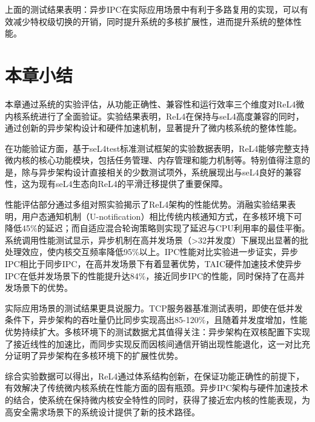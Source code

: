 上面的测试结果表明：异步IPC在实际应用场景中有利于多路复用的实现，可以有效减少特权级切换的开销，同时提升系统的多核扩展性，进而提升系统的整体性能。

\section{本章小结}
本章通过系统的实验评估，从功能正确性、兼容性和运行效率三个维度对ReL4微内核系统进行了全面验证。实验结果表明，ReL4在保持与seL4高度兼容的同时，通过创新的异步架构设计和硬件加速机制，显著提升了微内核系统的整体性能。

在功能验证方面，基于seL4test标准测试框架的实验数据表明，ReL4能够完整支持微内核的核心功能模块，包括任务管理、内存管理和能力机制等。特别值得注意的是，除与异步架构设计直接相关的少数测试项外，系统展现出与seL4良好的兼容性，这为现有seL4生态向ReL4的平滑迁移提供了重要保障。

性能评估部分通过多组对照实验揭示了ReL4架构的性能优势。消融实验结果表明，用户态通知机制（U-notification）相比传统内核通知方式，在多核环境下可降低45\%的延迟；而自适应混合轮询策略则实现了延迟与CPU利用率的最佳平衡。系统调用性能测试显示，异步机制在高并发场景（>32并发度）下展现出显著的批处理效应，使内核交互频率降低95\%以上。IPC性能对比实验进一步证实，异步IPC相比于同步IPC，在高并发场景下有着显著优势，TAIC硬件加速技术使异步IPC在低并发场景下的性能提升达84\%，接近同步IPC的性能，同时保持了在高并发场景下的优势。

实际应用场景的测试结果更具说服力。TCP服务器基准测试表明，即使在低并发条件下，异步架构的吞吐量仍比同步实现高出85-120\%，且随着并发度增加，性能优势持续扩大。多核环境下的测试数据尤其值得关注：异步架构在双核配置下实现了接近线性的加速比，而同步实现反而因核间通信开销出现性能退化，这一对比充分证明了异步架构在多核环境下的扩展性优势。

综合实验数据可以得出，ReL4通过体系结构创新，在保证功能正确性的前提下，有效解决了传统微内核系统在性能方面的固有瓶颈。异步IPC架构与硬件加速技术的结合，使系统在保持微内核安全特性的同时，获得了接近宏内核的性能表现，为高安全需求场景下的系统设计提供了新的技术路径。